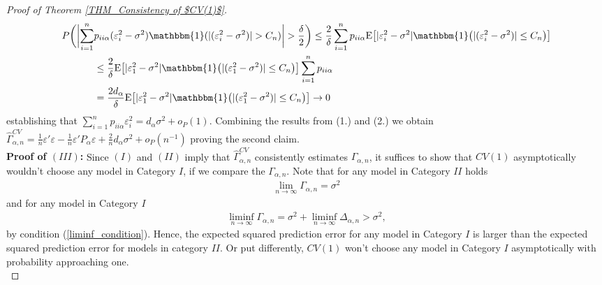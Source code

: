 \documentclass[Research_Module_ES.tex]{subfiles}
\begin{document}
\begin{proof}[Proof of Theorem \ref{THM_Consistency of $CV(1)$}]
	\begin{align*}
	P\biggl(\biggl|\sum_{i=1}^n &p_{ii\alpha}(\varepsilon_i^2-\sigma^2)\mathbbm{1}(|(\varepsilon_i^2-\sigma^2)|> C_n)\biggr|>\frac{\delta}{2}\biggr) \le \frac{2}{\delta}\sum_{i=1}^n p_{ii\alpha}\mathrm{E}\bigl[|\varepsilon_i^2-\sigma^2|\mathbbm{1}\bigl(|(\varepsilon_i^2-\sigma^2)|\le C_n\bigr)\bigr]\\
	&\le  \frac{2}{\delta}\mathrm{E}\bigl[|\varepsilon_1^2-\sigma^2|\mathbbm{1}\bigl(|(\varepsilon_1^2-\sigma^2)|\le C_n\bigr)\bigr]\sum_{i=1}^n p_{ii\alpha} \\
	&=  \frac{2d_\alpha}{\delta}\mathrm{E}\bigl[|\varepsilon_1^2-\sigma^2|\mathbbm{1}\bigl(|(\varepsilon_1^2-\sigma^2)|\le C_n\bigr)\bigr] \to 0
	\end{align*}
	establishing that $\sum_{i=1}^n p_{ii\alpha}\varepsilon_i^2= d_\alpha \sigma^2 + o_P(1)$.
	Combining the results from (1.) and (2.) we obtain $\hat{\Gamma}_{\alpha,n}^{CV} =\frac{1}{n}\varepsilon'\varepsilon- \frac{1}{n}\varepsilon'P_\alpha\varepsilon + \frac{2}{n}d_\alpha\sigma^2 +o_P(n^{-1})$
	proving the second claim.\\

\textbf{Proof of $(III)$:}
Since $(I)$ and $(II)$ imply that $\hat{\Gamma}_{\alpha,n}^{CV}$ consistently estimates $\Gamma_{\alpha,n}$, it suffices to show that $CV(1)$ asymptotically wouldn't choose any model in Category $I$, if we compare the $\Gamma_{\alpha,n}$. 
Note that for any model in Category $II$ holds
\begin{align*}
\lim_{n\to \infty} \Gamma_{\alpha,n} = \sigma^2 
\end{align*}
and for any model in Category $I$
\begin{align*}
\liminf_{n\to \infty} \Gamma_{\alpha,n} = \sigma^2 + \liminf_{n \to \infty} \Delta_{\alpha,n} >  \sigma^2,
\end{align*}
by condition (\ref{liminf_condition}). Hence, the expected squared prediction error for any model in Category $I$ is larger than the expected squared prediction error for models in category $II$. Or put differently, $CV(1)$ won't choose any model in Category $I$ asymptotically with probability approaching one.\\


\end{proof}
\end{document}
